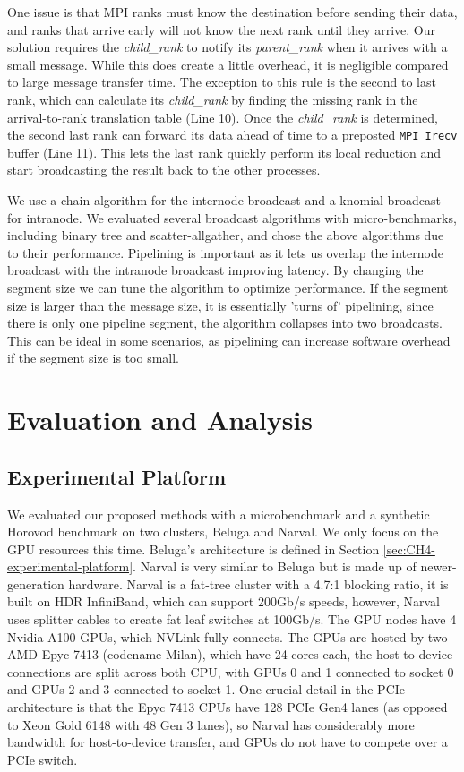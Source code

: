 One issue is that \gls{MPI} ranks must know the destination before sending their data, and ranks that arrive early will not know the next rank until they arrive.
Our solution requires the \textit{child\_rank} to notify its \textit{parent\_rank} when it arrives with a small message.
While this does create a little overhead, it is negligible compared to large message transfer time.
The exception to this rule is the second to last rank, which can calculate its \textit{child\_rank} by finding the missing rank in the arrival-to-rank translation table (Line 10).
Once the \textit{child\_rank} is determined, the second last rank can forward its data ahead of time to a preposted \texttt{MPI\_Irecv} buffer (Line 11).
This lets the last rank quickly perform its local reduction and start broadcasting the result back to the other processes.

We use a chain algorithm for the internode broadcast and a knomial broadcast for intranode. 
We evaluated several broadcast algorithms with micro-benchmarks, including binary tree and scatter-allgather, and chose the above algorithms due to their performance.  
Pipelining is important as it lets us overlap the internode broadcast with the intranode broadcast improving latency.
By changing the segment size we can tune the algorithm to optimize performance.
If the segment size is larger than the message size, it is essentially 'turns of' pipelining, since there is only one pipeline segment, the algorithm collapses into two broadcasts.
This can be ideal in some scenarios, as pipelining can increase software overhead if the segment size is too small.

\section{Evaluation and Analysis}
\subsection{Experimental Platform}
We evaluated our proposed methods with a microbenchmark and a synthetic Horovod benchmark on two clusters, Beluga and Narval.
We only focus on the \gls{GPU} resources this time.
Beluga's architecture is defined in Section \ref{sec:CH4-experimental-platform}.
Narval is very similar to Beluga but is made up of newer-generation hardware.
Narval is a fat-tree cluster with a 4.7:1 blocking ratio, it is built on HDR InfiniBand, which can support 200Gb/s speeds, however, Narval uses splitter cables to create fat leaf switches at 100Gb/s.
The \gls{GPU} nodes have 4 Nvidia A100 GPUs, which NVLink fully connects.
The \gls{GPU}s are hosted by two AMD Epyc 7413 (codename Milan), which have 24 cores each, the host to device connections are split across both \gls{CPU}, with \gls{GPU}s 0 and 1 connected to socket 0 and \gls{GPU}s 2 and 3 connected to socket 1. 
One crucial detail in the \gls{PCIe} architecture is that the Epyc 7413 \gls{CPU}s have 128 \gls{PCIe} Gen4 lanes (as opposed to Xeon Gold 6148 with 48 Gen 3 lanes), so Narval has considerably more bandwidth for host-to-device transfer, and \gls{GPU}s do not have to compete over a \gls{PCIe} switch.


